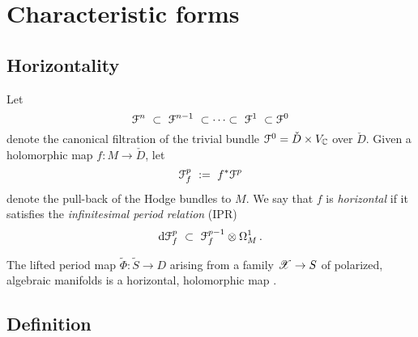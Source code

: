\documentclass[12pt]{amsart}
\numberwithin{equation}{section}
\numberwithin{table}{section}
\numberwithin{figure}{section}
\begin{document}
\section{Characteristic forms} \label{S:C}

\subsection{Horizontality}

Let 
\begin{equation}\label{E:cF}
  \cF^n \ \subset \ \cF^{n-1} \ \subset \cdots \subset \ \cF^1 \ 
  \subset \cF^0
\end{equation}
denote the canonical filtration of the trivial bundle $\mathcal F^0 = \check D \times V_\mathbb C$ over $\check D$.  Given a holomorphic map $f : M \to \check D$, let 
\[
  \mathcal F^p_f \ := \ f^*\mathcal F^p
\]
denote the pull-back of the Hodge bundles to $M$.  We say that $f$ is \emph{horizontal} if it satisfies the \emph{infinitesimal period relation} (IPR) 
\begin{equation}\label{E:IPR}
  \mathrm{d} \mathcal F^p_f \ \subset \ \mathcal F^{p-1}_f \otimes \Omega^1_M \,.
\end{equation}

\begin{example}
The lifted period map $\tilde \Phi : \tilde S\to D$ arising from a family $\mathscr{X} \to S$ of polarized, algebraic manifolds is a horizontal, holomorphic map \cite{MR0229641, MR0233825}.
\end{example}

\subsection{Definition}
\end{document}
